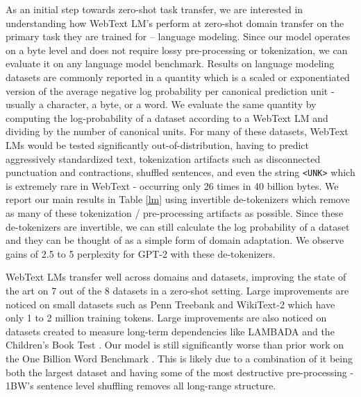 \documentclass{article}
\begin{document}
As an initial step towards zero-shot task transfer, we are interested in understanding how WebText LM's perform at zero-shot domain transfer on the primary task they are trained for -- language modeling. Since our model operates on a byte level and does not require lossy pre-processing or tokenization, we can evaluate it on any language model benchmark. Results on language modeling datasets are commonly reported in a quantity which is a scaled or exponentiated version of the average negative log probability per canonical prediction unit - usually a character, a byte, or a word. We evaluate the same quantity by computing the log-probability of a dataset according to a WebText LM and dividing by the number of canonical units. For many of these datasets, WebText LMs would be tested significantly out-of-distribution, having to predict aggressively standardized text, tokenization artifacts such as disconnected punctuation and contractions, shuffled sentences, and even the string \texttt{<UNK>} which is extremely rare in WebText - occurring only 26 times in 40 billion bytes. We report our main results in Table \ref{lm} using invertible de-tokenizers which remove as many of these tokenization / pre-processing artifacts as possible. Since these de-tokenizers are invertible, we can still calculate the log probability of a dataset and they can be thought of as a simple form of domain adaptation. We observe gains of 2.5 to 5 perplexity for GPT-2 with these de-tokenizers.

WebText LMs transfer well across domains and datasets, improving the state of the art on 7 out of the 8 datasets in a zero-shot setting. Large improvements are noticed on small datasets such as Penn Treebank and WikiText-2 which have only 1 to 2 million training tokens. Large improvements are also noticed on datasets created to measure long-term dependencies like LAMBADA \cite{paperno2016lambada} and the Children's Book Test \cite{hill2015goldilocks}. Our model is still significantly worse than prior work on the One Billion Word Benchmark \cite{chelba2013one}. This is likely due to a combination of it being both the largest dataset and having some of the most destructive pre-processing - 1BW's sentence level shuffling removes all long-range structure.

\end{document}
